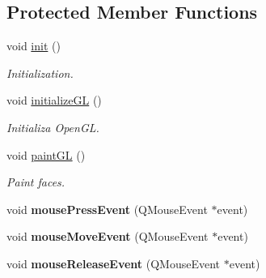 \subsection*{Protected Member Functions}
\begin{DoxyCompactItemize}
\item 
\hypertarget{class_g_l_widget_ac25c4189967c4f728dc94fb96e22fc65}{void \hyperlink{class_g_l_widget_ac25c4189967c4f728dc94fb96e22fc65}{init} ()}\label{class_g_l_widget_ac25c4189967c4f728dc94fb96e22fc65}

\begin{DoxyCompactList}\small\item\em Initialization. \end{DoxyCompactList}\item 
\hypertarget{class_g_l_widget_a7fab13e8cc9fc0730ca54c08b2c923a7}{void \hyperlink{class_g_l_widget_a7fab13e8cc9fc0730ca54c08b2c923a7}{initialize\+G\+L} ()}\label{class_g_l_widget_a7fab13e8cc9fc0730ca54c08b2c923a7}

\begin{DoxyCompactList}\small\item\em Initializa Open\+G\+L. \end{DoxyCompactList}\item 
\hypertarget{class_g_l_widget_a640b5570cb2b37724fd5b58a77339c5e}{void \hyperlink{class_g_l_widget_a640b5570cb2b37724fd5b58a77339c5e}{paint\+G\+L} ()}\label{class_g_l_widget_a640b5570cb2b37724fd5b58a77339c5e}

\begin{DoxyCompactList}\small\item\em Paint faces. \end{DoxyCompactList}\item 
\hypertarget{class_g_l_widget_ab144cc8064c1bbf6d0ef0646ca0bd06c}{void {\bfseries mouse\+Press\+Event} (Q\+Mouse\+Event $\ast$event)}\label{class_g_l_widget_ab144cc8064c1bbf6d0ef0646ca0bd06c}

\item 
\hypertarget{class_g_l_widget_a9043bac13d6f0a5307ea5c7f9b3caa50}{void {\bfseries mouse\+Move\+Event} (Q\+Mouse\+Event $\ast$event)}\label{class_g_l_widget_a9043bac13d6f0a5307ea5c7f9b3caa50}

\item 
\hypertarget{class_g_l_widget_ab992c4c25439a5ef23031991015451c1}{void {\bfseries mouse\+Release\+Event} (Q\+Mouse\+Event $\ast$event)}\label{class_g_l_widget_ab992c4c25439a5ef23031991015451c1}

\end{DoxyCompactItemize}



